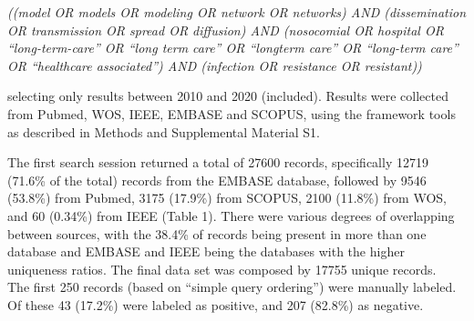 \documentclass{article}
\begin{document}
\emph{((model OR models OR modeling OR network OR networks) AND
(dissemination OR transmission OR spread OR diffusion) AND (nosocomial
OR hospital OR ``long-term-care'' OR ``long term care'' OR ``longterm
care'' OR ``long-term care'' OR ``healthcare associated'') AND
(infection OR resistance OR resistant))}

selecting only results between 2010 and 2020 (included). Results were
collected from Pubmed, WOS, IEEE, EMBASE and SCOPUS, using the framework
tools as described in Methods and Supplemental Material S1.

The first search session returned a total of 27600 records, specifically
12719 (71.6\% of the total) records from the EMBASE database, followed
by 9546 (53.8\%) from Pubmed, 3175 (17.9\%) from SCOPUS, 2100 (11.8\%)
from WOS, and 60 (0.34\%) from IEEE (Table 1). There were various
degrees of overlapping between sources, with the 38.4\% of records being
present in more than one database and EMBASE and IEEE being the
databases with the higher uniqueness ratios. The final data set was
composed by 17755 unique records.\\
The first 250 records (based on ``simple query ordering'') were manually
labeled. Of these 43 (17.2\%) were labeled as positive, and 207 (82.8\%)
as negative.
\end{document}
